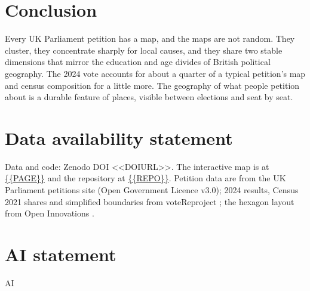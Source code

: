 \documentclass[11pt,a4paper]{article}
\begin{document}
\section{Conclusion}\label{sec:conc}
Every UK Parliament petition has a map, and the maps are not random. They cluster, they concentrate sharply for local causes, and they share two stable dimensions that mirror the education and age divides of British political geography. The 2024 vote accounts for about a quarter of a typical petition's map and census composition for a little more. The geography of what people petition about is a durable feature of places, visible between elections and seat by seat.

\section*{Data availability statement}
Data and code: Zenodo DOI <<DOIURL>>. The interactive map is at \url{{{PAGE}}} and the repository at \url{{{REPO}}}. Petition data are from the UK Parliament petitions site (Open Government Licence v3.0); 2024 results, Census 2021 shares and simplified boundaries from voteReproject \citep{horan2025}; the hexagon layout from Open Innovations \citep{openinnovations2023}.

\section*{AI statement}
{{AI}}
\end{document}
